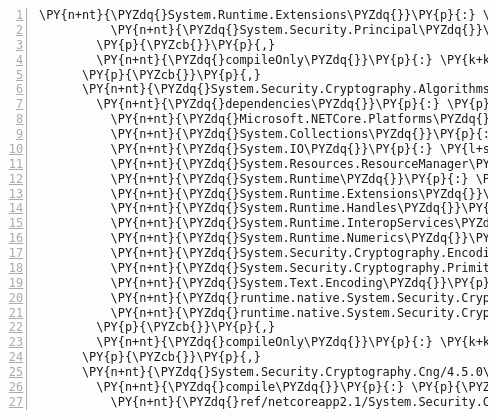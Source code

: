 \begin{Verbatim}[commandchars=\\\{\},numbers=left,firstnumber=1,stepnumber=1,numberblanklines=0]
          \PY{n+nt}{\PYZdq{}System.Runtime.Extensions\PYZdq{}}\PY{p}{:} \PY{l+s+s2}{\PYZdq{}4.3.0\PYZdq{}}\PY{p}{,}
          \PY{n+nt}{\PYZdq{}System.Security.Principal\PYZdq{}}\PY{p}{:} \PY{l+s+s2}{\PYZdq{}4.3.0\PYZdq{}}
        \PY{p}{\PYZcb{}}\PY{p}{,}
        \PY{n+nt}{\PYZdq{}compileOnly\PYZdq{}}\PY{p}{:} \PY{k+kc}{true}
      \PY{p}{\PYZcb{}}\PY{p}{,}
      \PY{n+nt}{\PYZdq{}System.Security.Cryptography.Algorithms/4.3.0\PYZdq{}}\PY{p}{:} \PY{p}{\PYZob{}}
        \PY{n+nt}{\PYZdq{}dependencies\PYZdq{}}\PY{p}{:} \PY{p}{\PYZob{}}
          \PY{n+nt}{\PYZdq{}Microsoft.NETCore.Platforms\PYZdq{}}\PY{p}{:} \PY{l+s+s2}{\PYZdq{}2.1.0\PYZhy{}rc1\PYZdq{}}\PY{p}{,}
          \PY{n+nt}{\PYZdq{}System.Collections\PYZdq{}}\PY{p}{:} \PY{l+s+s2}{\PYZdq{}4.3.0\PYZdq{}}\PY{p}{,}
          \PY{n+nt}{\PYZdq{}System.IO\PYZdq{}}\PY{p}{:} \PY{l+s+s2}{\PYZdq{}4.3.0\PYZdq{}}\PY{p}{,}
          \PY{n+nt}{\PYZdq{}System.Resources.ResourceManager\PYZdq{}}\PY{p}{:} \PY{l+s+s2}{\PYZdq{}4.3.0\PYZdq{}}\PY{p}{,}
          \PY{n+nt}{\PYZdq{}System.Runtime\PYZdq{}}\PY{p}{:} \PY{l+s+s2}{\PYZdq{}4.3.0\PYZdq{}}\PY{p}{,}
          \PY{n+nt}{\PYZdq{}System.Runtime.Extensions\PYZdq{}}\PY{p}{:} \PY{l+s+s2}{\PYZdq{}4.3.0\PYZdq{}}\PY{p}{,}
          \PY{n+nt}{\PYZdq{}System.Runtime.Handles\PYZdq{}}\PY{p}{:} \PY{l+s+s2}{\PYZdq{}4.3.0\PYZdq{}}\PY{p}{,}
          \PY{n+nt}{\PYZdq{}System.Runtime.InteropServices\PYZdq{}}\PY{p}{:} \PY{l+s+s2}{\PYZdq{}4.3.0\PYZdq{}}\PY{p}{,}
          \PY{n+nt}{\PYZdq{}System.Runtime.Numerics\PYZdq{}}\PY{p}{:} \PY{l+s+s2}{\PYZdq{}4.3.0\PYZdq{}}\PY{p}{,}
          \PY{n+nt}{\PYZdq{}System.Security.Cryptography.Encoding\PYZdq{}}\PY{p}{:} \PY{l+s+s2}{\PYZdq{}4.3.0\PYZdq{}}\PY{p}{,}
          \PY{n+nt}{\PYZdq{}System.Security.Cryptography.Primitives\PYZdq{}}\PY{p}{:} \PY{l+s+s2}{\PYZdq{}4.3.0\PYZdq{}}\PY{p}{,}
          \PY{n+nt}{\PYZdq{}System.Text.Encoding\PYZdq{}}\PY{p}{:} \PY{l+s+s2}{\PYZdq{}4.3.0\PYZdq{}}\PY{p}{,}
          \PY{n+nt}{\PYZdq{}runtime.native.System.Security.Cryptography.Apple\PYZdq{}}\PY{p}{:} \PY{l+s+s2}{\PYZdq{}4.3.0\PYZdq{}}\PY{p}{,}
          \PY{n+nt}{\PYZdq{}runtime.native.System.Security.Cryptography.OpenSsl\PYZdq{}}\PY{p}{:} \PY{l+s+s2}{\PYZdq{}4.3.0\PYZdq{}}
        \PY{p}{\PYZcb{}}\PY{p}{,}
        \PY{n+nt}{\PYZdq{}compileOnly\PYZdq{}}\PY{p}{:} \PY{k+kc}{true}
      \PY{p}{\PYZcb{}}\PY{p}{,}
      \PY{n+nt}{\PYZdq{}System.Security.Cryptography.Cng/4.5.0\PYZhy{}rc1\PYZdq{}}\PY{p}{:} \PY{p}{\PYZob{}}
        \PY{n+nt}{\PYZdq{}compile\PYZdq{}}\PY{p}{:} \PY{p}{\PYZob{}}
          \PY{n+nt}{\PYZdq{}ref/netcoreapp2.1/System.Security.Cryptography.Cng.dll\PYZdq{}}\PY{p}{:} \PY{p}{\PYZob{}}\PY{p}{\PYZcb{}}

\end{Verbatim}
